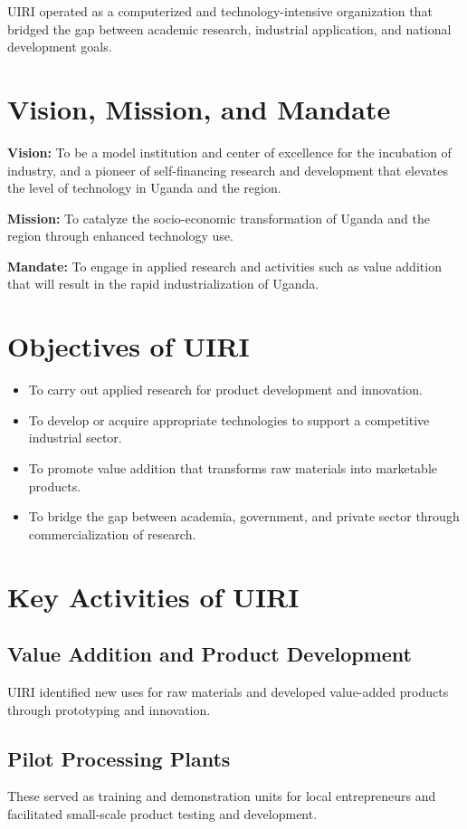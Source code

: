 \documentclass[12pt,a4paper]{report}
\begin{document}
\noindent UIRI operated as a computerized and technology-intensive organization that bridged the gap between academic research, industrial application, and national development goals.

\section{Vision, Mission, and Mandate}
\noindent\textbf{Vision:} To be a model institution and center of excellence for the incubation of industry, and a pioneer of self-financing research and development that elevates the level of technology in Uganda and the region.

\noindent\textbf{Mission:} To catalyze the socio-economic transformation of Uganda and the region through enhanced technology use.

\noindent\textbf{Mandate:} To engage in applied research and activities such as value addition that will result in the rapid industrialization of Uganda.

\section{Objectives of UIRI}
\begin{itemize}
    \item To carry out applied research for product development and innovation.
    \item To develop or acquire appropriate technologies to support a competitive industrial sector.
    \item To promote value addition that transforms raw materials into marketable products.
    \item To bridge the gap between academia, government, and private sector through commercialization of research.
\end{itemize}

\section{Key Activities of UIRI}

\subsection{Value Addition and Product Development}
\noindent UIRI identified new uses for raw materials and developed value-added products through prototyping and innovation.

\subsection{Pilot Processing Plants}
\noindent These served as training and demonstration units for local entrepreneurs and facilitated small-scale product testing and development.
\end{document}
